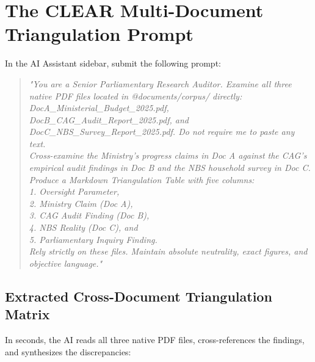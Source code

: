 \documentclass[11pt, a4paper]{report}
\begin{document}
\section{The CLEAR Multi-Document Triangulation Prompt}
In the AI Assistant sidebar, submit the following prompt:
\begin{quote}
\small
\textit{"You are a Senior Parliamentary Research Auditor. Examine all three native PDF files located in @documents/corpus/ directly: DocA\_Ministerial\_Budget\_2025.pdf, DocB\_CAG\_Audit\_Report\_2025.pdf, and DocC\_NBS\_Survey\_Report\_2025.pdf. Do not require me to paste any text. \\
Cross-examine the Ministry's progress claims in Doc A against the CAG's empirical audit findings in Doc B and the NBS household survey in Doc C. \\
Produce a Markdown Triangulation Table with five columns: \\
1. Oversight Parameter, \\
2. Ministry Claim (Doc A), \\
3. CAG Audit Finding (Doc B), \\
4. NBS Reality (Doc C), and \\
5. Parliamentary Inquiry Finding. \\
Rely strictly on these files. Maintain absolute neutrality, exact figures, and objective language."}
\end{quote}

\subsection{Extracted Cross-Document Triangulation Matrix}
In seconds, the AI reads all three native PDF files, cross-references the findings, and synthesizes the discrepancies:
\end{document}

